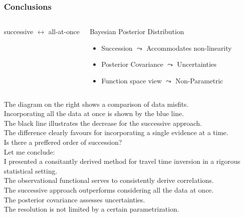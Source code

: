 \documentclass[aspectratio=169, t, 10pt,
    ]{beamer}
\begin{document}
\begin{frame}
    \frametitle{Conclusions}

\begin{columns}
%

    \begin{center}
        successive $\leftrightarrow$ all-at-once

        ~%
    \end{center}

    \begin{exampleblock}{Bayesian Posterior Distribution}
    \begin{itemize}
        \item Succession \hfill $\leadsto$ \hfill Accommodates non-linearity
        \item Posterior Covariance \hfill $\leadsto$ \hfill Uncertainties
        \item Function space view \hfill $\leadsto$ \hfill Non-Parametric
    \end{itemize}
    \end{exampleblock}


    \vspace{-6mm}
    \centering
    \only{}
\end{columns}

\end{frame}

The diagram on the right shows a comparison of data misfits.
\\
Incorporating all the data at once is shown by the blue line.
\\
The black line illustrates the decrease for the successive approach.
\\
The difference clearly favours for incorporating a single evidence at a time.
\\
Is there a preffered order of succession?
\\[2mm]

Let me conclude:
\\
I presented a consitantly derived method for travel time inversion in a rigorous statistical setting.
\\
The observational functional serves to consistently derive correlations.
\\
The successive approach outperforms considering all the data at once.
\\
The posterior covariance assesses uncertainties.
\\
The resolution is not limited by a certain parametrization.
\end{document}
